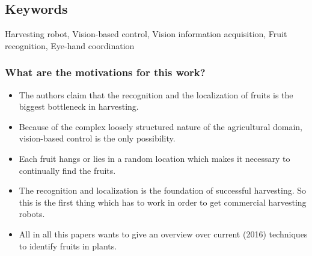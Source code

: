    
    \subsection*{Keywords}
    Harvesting robot, Vision-based control, Vision information acquisition, Fruit recognition, Eye-hand coordination
    
    
     
    \subsubsection*{What are the motivations for this work?}
    \begin{itemize}
        \item The authors claim that the recognition and the localization of fruits is the biggest bottleneck in harvesting.
        \item Because of the complex loosely structured nature of the agricultural domain, vision-based control is the only possibility.
        \item Each fruit hangs or lies in a random location which makes it necessary to continually find the fruits. 
        \item The recognition and localization is the foundation of successful harvesting. So this is the first thing which has to work in order to get commercial harvesting robots. 
        \item All in all this papers wants to give an overview over current (2016) techniques to identify fruits in plants.
    \end{itemize}
